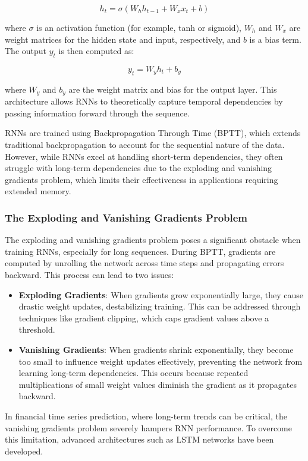 \documentclass[letterpaper]{article}
\begin{document}
\[ h_t = \sigma(W_h h_{t-1} + W_x x_t + b) \]

where \( \sigma \) is an activation function (for example, tanh or sigmoid), \( W_h \) and \( W_x \) are weight matrices for the hidden state and input, respectively, and \( b \) is a bias term. The output \( y_t \) is then computed as:

\[ y_t = W_y h_t + b_y \]

where \( W_y \) and \( b_y \) are the weight matrix and bias for the output layer. This architecture allows RNNs to theoretically capture temporal dependencies by passing information forward through the sequence.

RNNs are trained using Backpropagation Through Time (BPTT), which extends traditional backpropagation to account for the sequential nature of the data. However, while RNNs excel at handling short-term dependencies, they often struggle with long-term dependencies due to the exploding and vanishing gradients problem, which limits their effectiveness in applications requiring extended memory.

\subsubsection{The Exploding and Vanishing Gradients Problem}

The exploding and vanishing gradients problem poses a significant obstacle when training RNNs, especially for long sequences. During BPTT, gradients are computed by unrolling the network across time steps and propagating errors backward. This process can lead to two issues:

\begin{itemize}
    \item \textbf{Exploding Gradients}: When gradients grow exponentially large, they cause drastic weight updates, destabilizing training. This can be addressed through techniques like gradient clipping, which caps gradient values above a threshold.
    \item \textbf{Vanishing Gradients}: When gradients shrink exponentially, they become too small to influence weight updates effectively, preventing the network from learning long-term dependencies. This occurs because repeated multiplications of small weight values diminish the gradient as it propagates backward.
\end{itemize}

In financial time series prediction, where long-term trends can be critical, the vanishing gradients problem severely hampers RNN performance. To overcome this limitation, advanced architectures such as LSTM networks have been developed.
\end{document}
